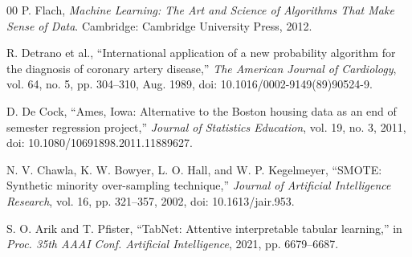 \documentclass[conference]{IEEEtran}
\begin{document}
\begin{thebibliography}{00}
 P. Flach, \textit{Machine Learning: The Art and Science of Algorithms That Make Sense of Data}. Cambridge: Cambridge University Press, 2012.

 R. Detrano et al., ``International application of a new probability algorithm for the diagnosis of coronary artery disease,'' \textit{The American Journal of Cardiology}, vol. 64, no. 5, pp. 304--310, Aug. 1989, doi: 10.1016/0002-9149(89)90524-9.

 D. De Cock, ``Ames, Iowa: Alternative to the Boston housing data as an end of semester regression project,'' \textit{Journal of Statistics Education}, vol. 19, no. 3, 2011, doi: 10.1080/10691898.2011.11889627.

 N. V. Chawla, K. W. Bowyer, L. O. Hall, and W. P. Kegelmeyer, ``SMOTE: Synthetic minority over-sampling technique,'' \textit{Journal of Artificial Intelligence Research}, vol. 16, pp. 321--357, 2002, doi: 10.1613/jair.953.

 S. O. Arik and T. Pfister, ``TabNet: Attentive interpretable tabular learning,'' in \textit{Proc. 35th AAAI Conf. Artificial Intelligence}, 2021, pp. 6679--6687.

\end{thebibliography}
\end{document}
